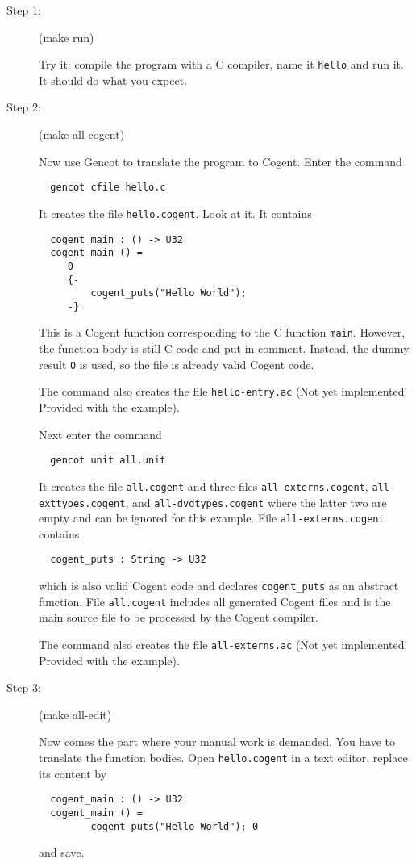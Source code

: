 \documentclass[a4paper]{report}
\newcommand{\code}[1]{\textnormal{\texttt{#1}}}
\begin{document}
\begin{description}
\item[Step 1:] (make run)

Try it: compile the program with a C compiler, name it \code{hello} and run it. It should do what you expect.

\item[Step 2:] (make all-cogent)

Now use Gencot to translate the program to Cogent. Enter the command
\begin{verbatim}
  gencot cfile hello.c
\end{verbatim}
It creates the file \code{hello.cogent}. Look at it. It contains
\begin{verbatim}
  cogent_main : () -> U32
  cogent_main () =
     0
     {-
         cogent_puts("Hello World");
     -}
\end{verbatim}
This is a Cogent function corresponding to the C function \code{main}. However, the function body is still C code
and put in comment. Instead, the dummy result \code{0} is used, so the file is already valid Cogent code.

The command also creates the file \code{hello-entry.ac} (Not yet implemented! Provided with the example).

Next enter the command
\begin{verbatim}
  gencot unit all.unit
\end{verbatim}
It creates the file \code{all.cogent} and three files \code{all-externs.cogent}, \code{all-exttypes.cogent}, 
and \code{all-dvdtypes.cogent} where the latter two are empty and can be ignored for this example. File 
\code{all-externs.cogent} contains
\begin{verbatim}
  cogent_puts : String -> U32
\end{verbatim}
which is also valid Cogent code and declares \code{cogent\_puts} as an abstract function. File \code{all.cogent}
includes all generated Cogent files and is the main source file to be processed by the Cogent compiler.

The command also creates the file \code{all-externs.ac} (Not yet implemented! Provided with the example).

\item[Step 3:] (make all-edit)

Now comes the part where your manual work is demanded. You have to translate the function bodies.
Open \code{hello.cogent} in a text editor, replace its content by
\begin{verbatim}
  cogent_main : () -> U32
  cogent_main () =
         cogent_puts("Hello World"); 0
\end{verbatim}
and save. 


\end{description}
\end{document}
